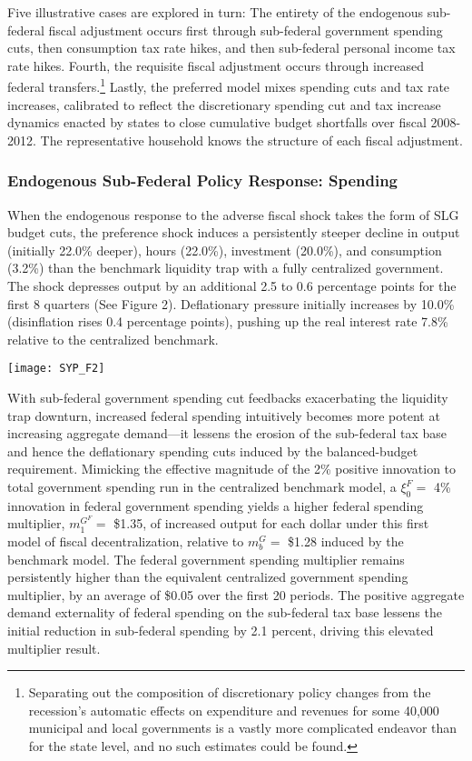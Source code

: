 \documentclass[12pt,letterpaper]{article}
\begin{document}
Five illustrative cases are explored in turn: The entirety of the endogenous sub-federal fiscal adjustment occurs first through sub-federal government spending cuts, then consumption tax rate hikes, and then sub-federal personal income tax rate hikes. Fourth, the requisite fiscal adjustment occurs through increased federal transfers.\footnote{Separating out the composition of discretionary policy changes from the recession's automatic effects on expenditure and revenues for some 40,000 municipal and local governments is a vastly more complicated endeavor than for the state level, and no such estimates could be found.} Lastly, the preferred model mixes spending cuts and tax rate increases, calibrated to reflect the discretionary spending cut and tax increase dynamics enacted by states to close cumulative budget shortfalls over fiscal 2008-2012. The representative household knows the structure of each fiscal adjustment. \smallskip

\subsubsection{Endogenous Sub-Federal Policy Response: Spending}
When the endogenous response to the adverse fiscal shock takes the form of SLG budget cuts, the preference shock induces a persistently steeper decline in output (initially 22.0\% deeper), hours (22.0\%), investment (20.0\%), and consumption (3.2\%) than the benchmark liquidity trap with a fully centralized government. The shock depresses output by an additional 2.5 to 0.6 percentage points for the first 8 quarters (See Figure 2). Deflationary pressure initially increases by 10.0\% (disinflation rises 0.4 percentage points), pushing up the real interest rate 7.8\% relative to the centralized benchmark.

\begin{center}
\texttt{[image: SYP\_F2]}
\end{center}

With sub-federal government spending cut feedbacks exacerbating the liquidity trap downturn, increased federal spending intuitively becomes more potent at increasing aggregate demand---it lessens the erosion of the sub-federal tax base and hence the deflationary spending cuts induced by the balanced-budget requirement. Mimicking the effective magnitude of the 2\% positive innovation to total government spending run in the centralized benchmark model, a $\xi^F_0 = $ 4\% innovation in federal government spending yields a higher federal spending multiplier, $m^{G^F}_1 = $ \$1.35, of increased output for each dollar under this first model of fiscal decentralization, relative to $m^{G}_b = $ \$1.28 induced by the benchmark model. The federal government spending multiplier remains persistently higher than the equivalent centralized government spending multiplier, by an average of \$0.05 over the first 20 periods. The positive aggregate demand externality of federal spending on the sub-federal tax base lessens the initial reduction in sub-federal spending by 2.1 percent, driving this elevated multiplier result. 
\end{document}
